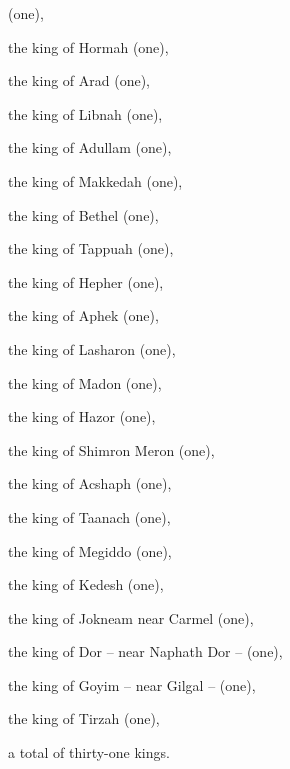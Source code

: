 {(one),
\par }{\Q {}the king
of Hormah
(one),
\par }{\Q the king
of Arad
(one),
\par }{\Q {}the king
of Libnah
(one),
\par }{\Q the king
of Adullam
(one),
\par }{\Q {}the king
of Makkedah
(one),
\par }{\Q the king
of Bethel
(one),
\par }{\Q {}the king
of Tappuah
(one),
\par }{\Q the king
of Hepher
(one),
\par }{\Q {}the king
of Aphek
(one),
\par }{\Q the king
of Lasharon
(one),
\par }{\Q {}the king
of Madon
(one),
\par }{\Q the king
of Hazor
(one),
\par }{\Q {}the king
of Shimron Meron
(one),
\par }{\Q the king
of Acshaph
(one),
\par }{\Q {}the king
of Taanach
(one),
\par }{\Q the king
of Megiddo
(one),
\par }{\Q {}the king
of Kedesh
(one),
\par }{\Q the king
of Jokneam
near Carmel
(one),
\par }{\Q {}the king
of Dor
– near Naphath Dor
– (one),
\par }{\Q the king
of Goyim
– near Gilgal
– (one),
\par }{\Q {}the king
of Tirzah
(one),
\par }{\Q a total
of thirty-one
kings.

}
